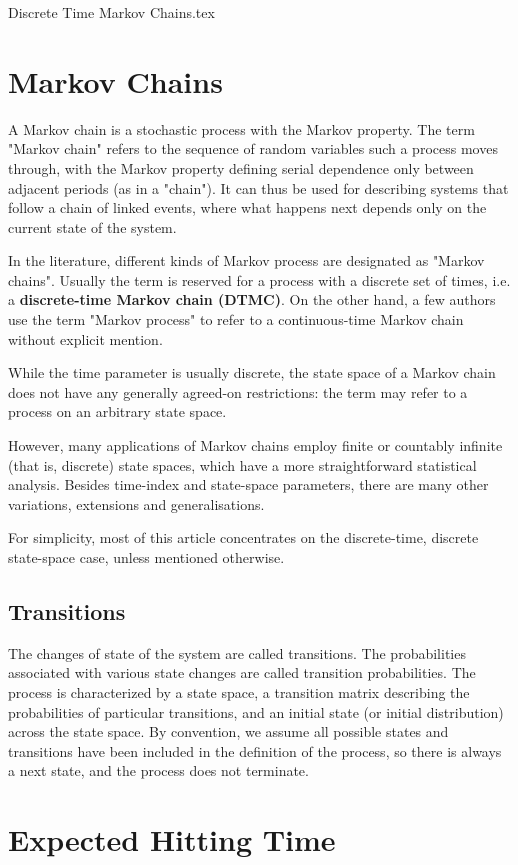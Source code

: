 Discrete Time Markov Chains.tex


\section{Markov Chains}
A Markov chain is a stochastic process with the Markov property. The term "Markov chain" refers to the sequence of random variables such a process moves through, with the Markov property defining serial dependence only between adjacent periods (as in a "chain"). It can thus be used for describing systems that follow a chain of linked events, where what happens next depends only on the current state of the system.

In the literature, different kinds of Markov process are designated as "Markov chains". Usually the term is reserved for a process with a discrete set of times, i.e. a \textbf{discrete-time Markov chain (DTMC)}. On the other hand, a few authors use the term "Markov process" to refer to a continuous-time Markov chain without explicit mention.

While the time parameter is usually discrete, the state space of a Markov chain does not have any generally agreed-on restrictions: the term may refer to a process on an arbitrary state space.

However, many applications of Markov chains employ finite or countably infinite (that is, discrete) state spaces, which have a more straightforward statistical analysis. Besides time-index and state-space parameters, there are many other variations, extensions and generalisations. 

For simplicity, most of this article concentrates on the discrete-time, discrete state-space case, unless mentioned otherwise.

\subsection{Transitions}
The changes of state of the system are called transitions. The probabilities associated with various state changes are called transition probabilities. The process is characterized by a state space, a transition matrix describing the probabilities of particular transitions, and an initial state (or initial distribution) across the state space. By convention, we assume all possible states and transitions have been included in the definition of the process, so there is always a next state, and the process does not terminate.

\section{Expected Hitting Time}

